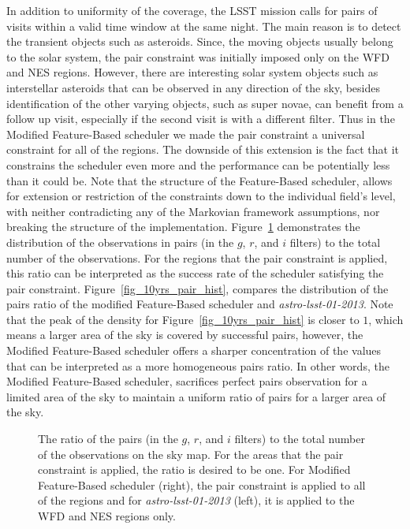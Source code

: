 \documentclass[12pt]{aastex62}
\theoremstyle{definition}
\begin{document}
In addition to uniformity of the coverage, the LSST mission calls for pairs of visits within a valid time window at the same night. The main reason is to detect the transient objects such as asteroids. Since, the moving objects usually belong to the solar system, the pair constraint was initially imposed only on the WFD and NES regions. However, there are interesting solar system objects such as interstellar asteroids that can be observed in any direction of the sky, besides identification of the other varying objects, such as super novae, can benefit from a follow up visit, especially if the second visit is with a different filter. Thus in the Modified Feature-Based scheduler we made the pair constraint a universal constraint for all of the regions. The downside of this extension is the fact that it constrains the scheduler even more and the performance can be potentially less than it could be. Note that the structure of the Feature-Based scheduler, allows for extension or restriction of the constraints down to the individual field's level, with neither contradicting any of the Markovian framework assumptions, nor breaking the structure of the implementation. Figure~\ref{fig_10yrs_pair} demonstrates the distribution of the observations in pairs (in the $g$, $r$, and $i$ filters) to the total number of the observations. For the regions that the pair constraint is applied, this ratio can be interpreted as the success rate of the scheduler satisfying the pair constraint. Figure~\ref{fig_10yrs_pair_hist}, compares the distribution of the pairs ratio of the modified Feature-Based scheduler and \textit{astro-lsst-01-2013}. Note that the peak of the density for Figure~\ref{fig_10yrs_pair_hist} is closer to $1$, which means a larger area of the sky is covered by successful pairs, however, the Modified Feature-Based scheduler offers a sharper concentration of the values that can be interpreted as a more homogeneous pairs ratio. In other words, the Modified Feature-Based scheduler, sacrifices perfect pairs observation for a limited area of the sky to maintain a uniform ratio of pairs for a larger area of the sky.

\begin{figure}[h!]
\caption{The ratio of the pairs (in the $g$, $r$, and $i$ filters) to the total number of the observations on the sky map. For the areas that the pair constraint is applied, the ratio is desired to be one. For Modified Feature-Based scheduler (right), the pair constraint is applied to all of the regions and for \textit{astro-lsst-01-2013} (left), it is applied to the WFD and NES regions only.}
\label{fig_10yrs_pair}
\end{figure}
\end{document}

